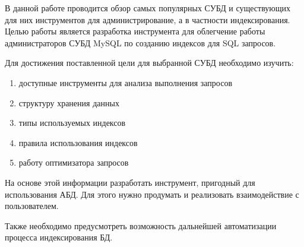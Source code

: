 В данной работе проводится обзор самых популярных СУБД и существующих для них инструментов для администрирование, а в частности индексирования.  Целью работы является разработка инструмента для облегчение работы администраторов СУБД MySQL по созданию индексов для SQL запросов.

Для достижения поставленной цели для выбранной СУБД необходимо изучить: 
\begin{enumerate}
\item доступные инструменты для анализа выполнения запросов
\item структуру хранения данных
\item типы используемых индексов
\item правила использования индексов
\item работу оптимизатора запросов
\end{enumerate}

На основе этой информации разработать инструмент, пригодный для использования АБД. Для этого нужно продумать и реализовать взаимодействие с пользователем.

Также необходимо предусмотреть возможность дальнейшей автоматизации процесса индексирования БД.